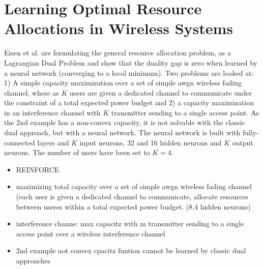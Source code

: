 \section{Learning Optimal Resource Allocations in Wireless Systems \cite{Eisen}} 
Eisen et al. are formulating the general resource allocation problem, as a Lagrangian Dual Problem and show that the duality gap is zero when learned by a neural network (converging to a local minimum). Two problems are looked at: 1) A simple capacity maximization over a set of simple \gls{awgn} wireless fading channel, where as $K$ users are given a dedicated channel to communicate under the constraint of a total expected power budget and 2) a capacity maximization in an interference channel with $K$ transmitter sending to a single access point. As the 2nd example has a non-convex capacity, it is not solvable with the classic dual approach, but with a neural network. The neural network is built with fully-connected layers and $K$ input neurons, 32 and 16 hidden neurons and $K$ output neurons. The number of users have been set to $K=4$.
\ifdefined\SHOWNOTES
\begin{itemize}
    \item REINFORCE
    \item maximizing total capacity over a set of simple \gls{awgn} wireless fading channel (each user is given a dedicated channel to communicate, allocate resources between useres within a total expected power budget. (8,4 hidden neurons)
    \item interference channe: max capacitz with m transmitter sending to a single access point over a wireless interference channel
    \item 2nd example not convex cpacitz funtion cannot be learned by classic dual approaches
\end{itemize}
\fi


